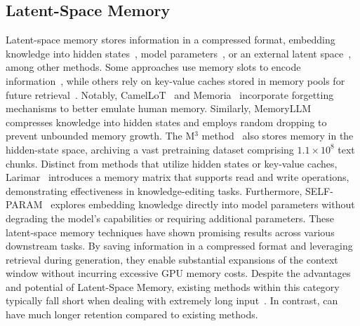 \subsection{Latent-Space Memory}
Latent-space memory stores information in a compressed format, embedding knowledge into hidden states~\citep{kNNLM, memoryllm}, model parameters~\citep{self-param}, or an external latent space~\citep{larimar}, among other methods. Some approaches use memory slots to encode information~\citep{al2021memory}, while others rely on key-value caches stored in memory pools for future retrieval~\citep{MemoringTransformers, LongMEM, he2024camelot, Memoria}. Notably, CamelLoT~\citep{he2024camelot} and Memoria~\citep{Memoria} incorporate forgetting mechanisms to better emulate human memory. Similarly, MemoryLLM~\citep{memoryllm} compresses knowledge into hidden states and employs random dropping to prevent unbounded memory growth. The M$^3$ method~\citep{memory3} also stores memory in the hidden-state space, archiving a vast pretraining dataset comprising $1.1\times 10^8$ text chunks. Distinct from methods that utilize hidden states or key-value caches, Larimar~\citep{larimar} introduces a memory matrix that supports read and write operations, demonstrating effectiveness in knowledge-editing tasks. Furthermore, SELF-PARAM~\citep{self-param} explores embedding knowledge directly into model parameters without degrading the model's capabilities or requiring additional parameters. These latent-space memory techniques have shown promising results across various downstream tasks. By saving information in a compressed format and leveraging retrieval during generation, they enable substantial expansions of the context window without incurring excessive GPU memory costs.
Despite the advantages and potential of Latent-Space Memory, existing methods within this category typically fall short when dealing with extremely long input~\citep{larimar,self-param,memoryllm,he2024camelot}. In contrast, \ours can have much longer retention compared to existing methods.